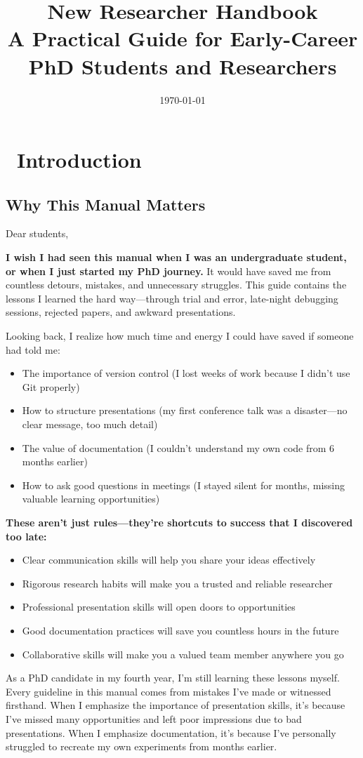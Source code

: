 \documentclass[11pt,a4paper]{article}
\title{\textbf{New Researcher Handbook}\\
\large A Practical Guide for Early-Career PhD Students and Researchers}
\author{\href{https://aaronluo00.github.io/Aaron_Homepage/}{Xiaolong Luo}\\
Harvard University\\
School of Engineering and Applied Sciences\\
\vspace{0.5cm}
\small\textit{Also available on: \href{http://xhslink.com/m/5E5I3850qZP}{Xiaohongshu \begin{CJK}{UTF8}{gbsn}(小红书)\end{CJK}}}}
\date{\today}
\newcommand{\gooditem}{\item[\color{green!70!black}\faCheck]}
\newcommand{\ideaitem}{\item[\color{yellow!80!black}\faLightbulb]}
\begin{document}
\maketitle

\tableofcontents
\newpage

\section{\faBook~Introduction}

\subsection{Why This Manual Matters}

Dear students,

\textbf{I wish I had seen this manual when I was an undergraduate student, or when I just started my PhD journey.} It would have saved me from countless detours, mistakes, and unnecessary struggles. This guide contains the lessons I learned the hard way—through trial and error, late-night debugging sessions, rejected papers, and awkward presentations.

Looking back, I realize how much time and energy I could have saved if someone had told me:
\begin{itemize}
    \ideaitem The importance of version control (I lost weeks of work because I didn't use Git properly)
    \ideaitem How to structure presentations (my first conference talk was a disaster—no clear message, too much detail)
    \ideaitem The value of documentation (I couldn't understand my own code from 6 months earlier)
    \ideaitem How to ask good questions in meetings (I stayed silent for months, missing valuable learning opportunities)
\end{itemize}

\textbf{These aren't just rules—they're shortcuts to success that I discovered too late:}
\begin{itemize}
    \gooditem Clear communication skills will help you share your ideas effectively
    \gooditem Rigorous research habits will make you a trusted and reliable researcher
    \gooditem Professional presentation skills will open doors to opportunities
    \gooditem Good documentation practices will save you countless hours in the future
    \gooditem Collaborative skills will make you a valued team member anywhere you go
\end{itemize}

As a PhD candidate in my fourth year, I'm still learning these lessons myself. Every guideline in this manual comes from mistakes I've made or witnessed firsthand. When I emphasize the importance of presentation skills, it's because I've missed many opportunities and left poor impressions due to bad presentations. When I emphasize documentation, it's because I've personally struggled to recreate my own experiments from months earlier.
\end{document}
